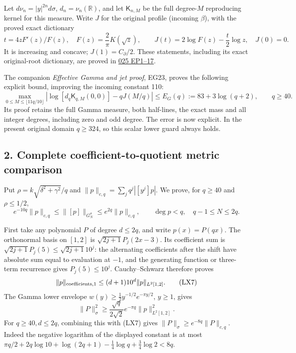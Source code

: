 \documentclass[10pt]{article}
\begin{document}
Let \(d\nu_n=|y|^{2n}d\sigma\), \(d_n=\nu_n(\mathbb R)\), and let \(\mathsf K_{n,M}\) be the full degree-\(M\) reproducing kernel for this measure. Write \(J\) for the original profile (incoming \(\beta\)), with the proved exact dictionary \[
t=4zF'(z)/F(z),\quad F(z)=\frac2\pi K(\sqrt z),\qquad
J(t)=2\log F(z)-\frac t2\log z,
\quad J(0)=0.
\tag{LX4}
\] It is increasing and concave; \(J(1)=C_\partial/2\). These statements, including its exact original-root dictionary, are proved in \href{https://github.com/KokunoYumeto/zeta-function-research-reader/blob/6cf5b3aa8ff395eba6b5512b28d117334da5767b/workbenches/splitzero-tandem/continuations/20260922-cutoff-profile/ELLIPTIC_PROFILE_PROOF.md}{025 EP1--17}.

The companion \emph{Effective Gamma and jet proof}, EG23, proves the following explicit bound, improving the incoming constant 110: \[
\max_{0\le M\le\lfloor11q/10\rfloor}
\left|\log[d_q\mathsf K_{q,M}(0,0)]-qJ(M/q)\right|
\le E_G(q):=83+3\log(q+2),\qquad q\ge40.
\tag{LX5}
\] Its proof retains the full Gamma measure, both half-lines, the exact mass and all integer degrees, including zero and odd degree. The error is now explicit. In the present original domain \(q\ge324\), so this scalar lower guard always holds.

\subsection{2. Complete coefficient-to-quotient metric comparison}\label{complete-coefficient-to-quotient-metric-comparison}

Put \(\rho=k\sqrt{\delta^2+\gamma^2}/q\) and \(\|p\|_{c,q}=\sum_jq^j|[y^j]p|\). We prove, for \(q\ge40\) and \(\rho\le1/2\), \[
e^{-10q}\|p\|_{c,q}\le\|[p]\|_{G_N^\sigma}
\le e^{2q}\|p\|_{c,q},\qquad \deg p<q,\quad q-1\le N\le2q.
\tag{LX6}
\]

First take any polynomial \(P\) of degree \(d\le2q\), and write \(p(x)=P(qx)\). The orthonormal basis on \([1,2]\) is \(\sqrt{2j+1}P_j(2x-3)\). Its coefficient sum is \(\sqrt{2j+1}P_j(5)\le\sqrt{2j+1}10^j\): the alternating coefficients after the shift have absolute sum equal to evaluation at \(-1\), and the generating function or three-term recurrence gives \(P_j(5)\le10^j\). Cauchy--Schwarz therefore proves \[
\|p\|_{\rm coefficients,1}\le(d+1)10^d\|p\|_{L^2[1,2]}.
\tag{LX7}
\] The Gamma lower envelope \(w(y)\ge\tfrac12y^{-1/2}e^{-\pi y/2}\), \(y\ge1\), gives \[
\|P\|_\sigma^2\ge\frac{\sqrt q}{2\sqrt2}e^{-\pi q}
\|p\|_{L^2[1,2]}^2.
\] For \(q\ge40,d\le2q\), combining this with (LX7) gives \(\|P\|_\sigma\ge e^{-8q}\|P\|_{c,q}\). Indeed the negative logarithm of the displayed constant is at most \(\pi q/2+2q\log10+\log(2q+1)-\tfrac14\log q+\tfrac34\log2<8q\).
\end{document}
